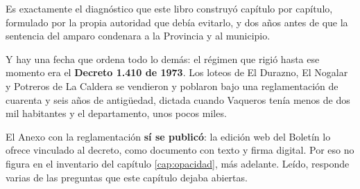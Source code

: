 Es exactamente el diagnóstico que este libro construyó capítulo por capítulo, formulado por la propia autoridad que debía evitarlo, y dos años antes de que la sentencia del amparo condenara a la Provincia y al municipio.

Y hay una fecha que ordena todo lo demás: el régimen que rigió hasta ese momento era el \textbf{Decreto 1.410 de 1973}. Los loteos de El Durazno, El Nogalar y Potreros de La Caldera se vendieron y poblaron bajo una reglamentación de cuarenta y seis años de antigüedad, dictada cuando Vaqueros tenía menos de dos mil habitantes y el departamento, unos pocos miles.

El Anexo con la reglamentación \textbf{sí se publicó}: la edición web del Boletín lo ofrece vinculado al decreto, como documento con texto y firma digital. Por eso no figura en el inventario del capítulo \ref{cap:opacidad}, más adelante. Leído, responde varias de las preguntas que este capítulo dejaba abiertas.


